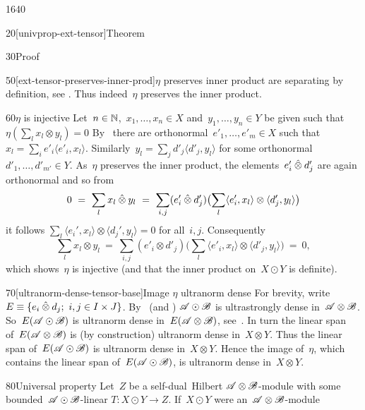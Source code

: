 \begin{parsec}{1640}
\begin{point}{20}[univprop-ext-tensor]{Theorem}
\begin{point}{30}{Proof}
\begin{point}{50}[ext-tensor-preserves-inner-prod]{$\eta$ preserves inner product}
    are separating by definition, see .
Thus indeed~$\eta$ preserves the inner product.
\end{point}
\begin{point}{60}{$\eta$ is injective}%
Let~$n \in \mathbb{N}$,~$x_1, \ldots, x_n \in X$
    and~$y_1,\ldots, y_n \in Y$
    be given such that~$\eta(\sum_l x_l \otimes y_l) = 0$
By~
    there are orthonormal~$e'_1,\ldots, e'_m \in X$
    such that~$x_l = \sum_i e'_i \langle e'_i, x_l\rangle$.
Similarly~$y_l = \sum_j d'_j \langle d'_j, y_l\rangle$
for some orthonormal~$d'_1, \ldots, d'_{m'} \in Y$.
As~$\eta$ preserves the inner product,
    the elements~$e_i'\mathbin{\hat{\otimes}} d_j'$ are again orthonormal
    and so from
\begin{equation*}
    0 \ =\  \sum_l x_l \mathbin{\hat{\otimes}} y_l
    \ =\  \sum_{i,j} (e'_i \mathbin{\hat{\otimes}} d'_j) \bigl(\sum_l
         \langle e'_i, x_l\rangle \otimes \langle d'_j, y_l\rangle\bigr)
\end{equation*}
         it follows
         $\sum_l \langle e_i',x_l\rangle \otimes \langle d_j',y_l\rangle = 0$
         for all~$i,j$.
Consequently
\begin{equation*}
    \sum_l x_l \otimes y_l
        \ =\  \sum_{i,j} (e'_i \otimes d'_j) \bigl(\sum_l
        \langle e'_i, x_l \rangle \otimes \langle d'_j, y_l \rangle 
        \bigr) \ = \ 0,
\end{equation*}
which shows~$\eta$ is injective
    (and that the inner product on~$X \odot Y$ is definite).
\end{point}
\begin{point}{70}[ultranorm-dense-tensor-base]{Image $\eta$ ultranorm dense}%
For brevity, write~$E \equiv \{ e_i \mathbin{\hat{\otimes}} d_j; \ i,j \in I\times J\}$.
By~ (and )
    $\mathscr{A} \odot \mathscr{B}$ is ultrastrongly dense in~$\mathscr{A} \otimes \mathscr{B}$.
So~$E (\mathscr{A} \odot \mathscr{B})$
    is ultranorm dense in~$E (\mathscr{A} \otimes \mathscr{B})$,
    see~.
In turn the linear span of~$E (\mathscr{A} \otimes \mathscr{B})$
    is (by construction) ultranorm dense in~$X \otimes Y$.
Thus the linear span of~$E (\mathscr{A} \odot \mathscr{B})$
    is ultranorm dense in~$X \otimes Y$.
Hence the image of~$\eta$,
    which contains the linear span of~$E (\mathscr{A} \odot \mathscr{B})$,
    is ultranorm dense in~$X \otimes Y$.
\end{point}
\begin{point}{80}{Universal property}%
Let~$Z$ be a self-dual~Hilbert $\mathscr{A} \otimes \mathscr{B}$-module
 with some bounded~$\mathscr{A} \odot \mathscr{B}$-linear $T\colon X \odot Y \to Z$.
If~$X \odot Y$ were an~$\mathscr{A} \otimes \mathscr{B}$-module

\end{point}
\end{point}
\end{point}
\end{parsec}
